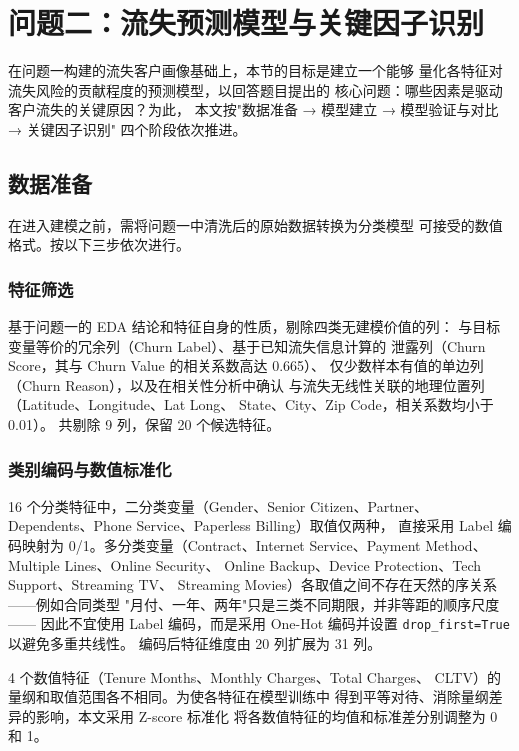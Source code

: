 \section{问题二：流失预测模型与关键因子识别}

在问题一构建的流失客户画像基础上，本节的目标是建立一个能够
量化各特征对流失风险的贡献程度的预测模型，以回答题目提出的
核心问题：哪些因素是驱动客户流失的关键原因？为此，
本文按"数据准备 → 模型建立 → 模型验证与对比 → 关键因子识别"
四个阶段依次推进。

\subsection{数据准备}

在进入建模之前，需将问题一中清洗后的原始数据转换为分类模型
可接受的数值格式。按以下三步依次进行。

\subsubsection*{特征筛选}

基于问题一的 EDA 结论和特征自身的性质，剔除四类无建模价值的列：
与目标变量等价的冗余列（Churn Label）、基于已知流失信息计算的
泄露列（Churn Score，其与 Churn Value 的相关系数高达 0.665）、
仅少数样本有值的单边列（Churn Reason），以及在相关性分析中确认
与流失无线性关联的地理位置列（Latitude、Longitude、Lat Long、
State、City、Zip Code，相关系数均小于 0.01）。
共剔除 9 列，保留 20 个候选特征。

\subsubsection*{类别编码与数值标准化}

16 个分类特征中，二分类变量（Gender、Senior Citizen、Partner、
Dependents、Phone Service、Paperless Billing）取值仅两种，
直接采用 Label 编码映射为 0/1。多分类变量（Contract、Internet
Service、Payment Method、Multiple Lines、Online Security、
Online Backup、Device Protection、Tech Support、Streaming TV、
Streaming Movies）各取值之间不存在天然的序关系——例如合同类型
"月付、一年、两年"只是三类不同期限，并非等距的顺序尺度——
因此不宜使用 Label 编码，而是采用 One-Hot 编码并设置
\texttt{drop\_first=True} 以避免多重共线性。
编码后特征维度由 20 列扩展为 31 列。

4 个数值特征（Tenure Months、Monthly Charges、Total Charges、
CLTV）的量纲和取值范围各不相同。为使各特征在模型训练中
得到平等对待、消除量纲差异的影响，本文采用 Z-score 标准化
将各数值特征的均值和标准差分别调整为 0 和 1。


